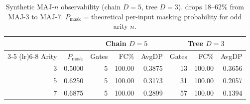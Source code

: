 \begin{table}[tbp]
  \caption{Synthetic MAJ-$n$ observability (chain $D{=}5$, tree $D{=}3$). \AvgDP{} drops 18--62\% from MAJ-3 to MAJ-7. $P_\text{mask}$ = theoretical per-input masking probability for odd arity $n$.}
  \label{tab:majn-arity}
  \centering
  \small
  \begin{tabular}{rrrrrrrr}
    \toprule
          &              & \multicolumn{3}{c}{Chain $D{=}5$} & \multicolumn{3}{c}{Tree $D{=}3$} \\
    \cmidrule(lr){3-5} \cmidrule(lr){6-8}
    Arity & $P_\text{mask}$ & Gates & FC\% & AvgDP & Gates & FC\% & AvgDP \\
    \midrule
3 & 0.5000 & 5 & 100.00 & 0.3875 & 13 & 100.00 & 0.3656 \\
    5 & 0.6250 & 5 & 100.00 & 0.3173 & 31 & 100.00 & 0.2057 \\
    7 & 0.6875 & 5 & 100.00 & 0.2899 & 57 & 100.00 & 0.1394 \\
    \bottomrule
  \end{tabular}
\end{table}
